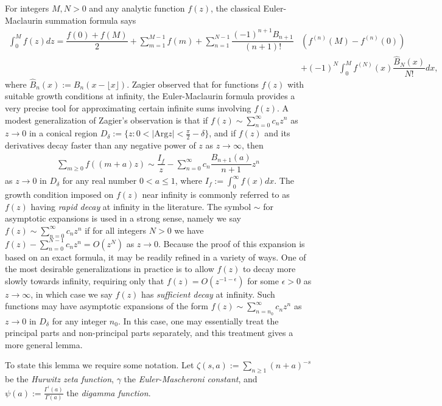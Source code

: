 \documentclass[11pt,reqno]{amsart}
\theoremstyle{definition}
\theoremstyle{plain}
\theoremstyle{named}
\numberwithin{equation}{section}
\theoremstyle{example}
\def\lp{\left(}
\def\rp{\right)}
\begin{document}
For integers $M, N > 0$ and any analytic function $f(z)$, the classical Euler-Maclaurin summation formula says
\begin{align*}
    \int_0^M f(z) dz = \dfrac{f(0) + f(M)}{2} + \sum_{m = 1}^{M-1} f(m) + \sum_{n = 1}^{N-1} \dfrac{(-1)^{n+1} B_{n+1}}{(n+1)!} &\lp f^{(n)}(M) - f^{(n)}(0) \rp \\ &+ (-1)^N \int_0^M f^{(N)}(x) \dfrac{\widehat{B}_N(x)}{N!} dx,
\end{align*}
where $\widehat{B}_n(x) := B_n\lp x - \lfloor x \rfloor \rp$. Zagier observed \cite[Formula (44)]{Zagier} that for functions $f(z)$ with suitable growth conditions at infinity, the Euler-Maclaurin formula provides a very precise tool for approximating certain infinite sums involving $f(z)$. A modest generalization of Zagier's observation is that if $f(z) \sim \sum_{n = 0}^\infty c_n z^n$ as $z \to 0$ in a  conical region $D_\delta := \{ z : 0 < \left| \mathrm{Arg}{z} \right| < \frac{\pi}{2} - \delta \}$, and if $f(z)$ and its derivatives decay faster than any negative power of $z$ as $z \to \infty$, then
\begin{align*}
    \sum_{m \geq 0} f\lp (m+a)z \rp \sim \dfrac{I_f}{z} - \sum_{n = 0}^\infty c_n \dfrac{B_{n+1}(a)}{n+1} z^n
\end{align*}
as $z \to 0$ in $D_\delta$ for any real number $0 < a \leq 1$, where $I_f := \int_0^\infty f(x) dx$. The growth condition imposed on $f(z)$ near infinity is commonly referred to as $f(z)$ having {\it rapid decay} at infinity in the literature. The symbol $\sim$ for asymptotic expansions is used in a strong sense, namely we say $f(z) \sim \sum_{n=0}^\infty c_n z^n$ if for all integers $N > 0$ we have $f(z) - \sum_{n=0}^{N-1} c_n z^n = O\lp z^N \rp$ as $z \to 0$. Because the proof of this expansion is based on an exact formula, it may be readily refined in a variety of ways. One of the most desirable generalizations in practice is to allow $f(z)$ to decay more slowly towards infinity, requiring only that $f(z) = O\lp z^{- 1 - \epsilon} \rp$ for some $\epsilon > 0$ as $z \to \infty$, in which case we say $f(z)$ has {\it sufficient decay} at infinity. Such functions may have asymptotic expansions of the form $f(z) \sim \sum_{n = n_0}^\infty c_n z^n$ as $z \to 0$ in $D_\delta$ for any integer $n_0$. In this case, one may essentially treat the principal parts and non-principal parts separately, and this treatment gives a more general lemma.

To state this lemma we require some notation. Let $\zeta(s,a) := \sum_{n \geq 1} \lp n + a \rp^{-s}$ be the {\it Hurwitz zeta function}, $\gamma$ the {\it Euler-Mascheroni constant}, and $\psi(a) := \frac{\Gamma^\prime(a)}{\Gamma(a)}$ the {\it digamma function}.
\end{document}
